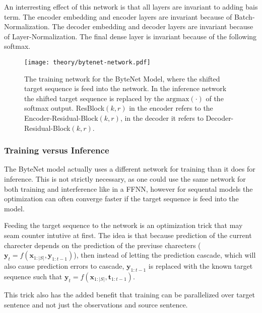 An interresting effect of this network is that all layers are invariant to adding bais term. The encoder embedding and encoder layers are invariant because of Batch-Normalization. The decoder embedding and decoder layers are invariant because of Layer-Normalization. The final dense layer is invariant because of the following softmax.

\begin{figure}[H]
    \centering
    \texttt{[image: theory/bytenet-network.pdf]}
    \caption{The training network for the ByteNet Model, where the shifted target sequence is feed into the network. In the inference network the shifted target sequence is replaced by the $\mathrm{argmax}(\cdot)$ of the softmax output. ResBlock$(k, r)$ in the encoder refers to the Encoder-Residual-Block$(k, r)$, in the decoder it refers to Decoder-Residual-Block$(k, r)$.}
    \label{fig:bytenet:network}
\end{figure}

\subsubsection{Training versus Inference}
The ByteNet model actually uses a different network for training than it does for inference. This is not strictly necessary, as one could use the same network for both training and interference like in a FFNN, however for sequental models the optimization can often converge faster if the target sequence is feed into the model.

Feeding the target sequence to the network is an optimization trick that may seam counter intutive at first. The idea is that because prediction of the current charecter depends on the prediction of the previuse charecters ($\mathbf{y}_t = f(\mathbf{x}_{1:|S|}, \mathbf{y}_{1:t-1})$), then instead of letting the prediction cascade, which will also cause prediction errors to cascade, $\mathbf{y}_{1:t-1}$ is replaced with the known target sequence such that $\mathbf{y}_t = f(\mathbf{x}_{1:|S|}, \mathbf{t}_{1:t-1})$.

This trick also has the added benefit that training can be parallelized over target sentence and not just the observations and source sentence. 

